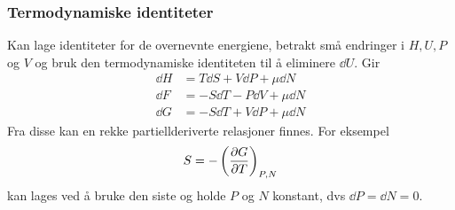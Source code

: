 \documentclass[12pt]{article}
\begin{document}
\subsubsection{Termodynamiske identiteter}
Kan lage identiteter for de overnevnte energiene, betrakt små endringer i $H, U, P$ og $V$
og bruk den termodynamiske identiteten til å eliminere $\dd U$. Gir
\begin{align*}
  \dd H &= T \dd S + V \dd P + \mu \dd N \\
  \dd F &= -S \dd T - P \dd V + \mu \dd N \\
  \dd G &= -S \dd T + V \dd P + \mu \dd N
\end{align*}
Fra disse kan en rekke partiellderiverte relasjoner finnes. For eksempel
\begin{align*}
  S = -\left( \pdv{G}{T} \right)_{P,N}
\end{align*}
kan lages ved å bruke den siste og holde $P$ og $N$ konstant, dvs $\dd P = \dd N = 0$.
\end{document}
